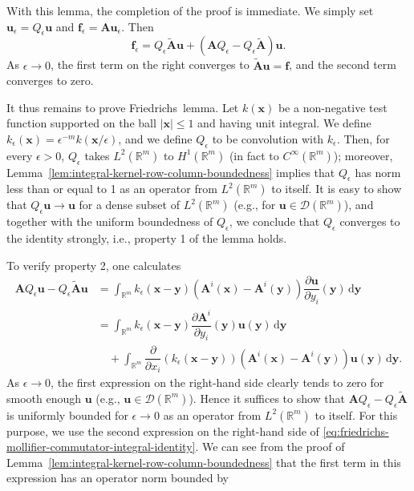 With this lemma, the completion of the proof is immediate. We simply set $\bm{u}_\epsilon=Q_\epsilon\bm{u}$ and $\bm{f}_\epsilon=\bm{A}\bm{u}_\epsilon$. Then
\begin{equation}\label{eq:symmetric-hyperbolic-friedrichs-graph-approximation}
\bm{f}_\epsilon=Q_\epsilon\widetilde{\bm{A}}\bm{u}+(\bm{A}Q_\epsilon-Q_\epsilon\widetilde{\bm{A}})\bm{u}.
\end{equation}
As $\epsilon\to0$, the first term on the right converges to $\widetilde{\bm{A}}\bm{u}=\bm{f}$, and the second term converges to zero.

\begin{Proof}
It thus remains to prove Friedrichs\textquotesingle\ lemma. Let $k(\bm{x})$ be a non-negative test function supported on the ball $|\bm{x}|\leq1$ and having unit integral. We define $k_\epsilon(\bm{x})=\epsilon^{-m}k(\bm{x}/\epsilon)$, and we define $Q_\epsilon$ to be convolution with $k_\epsilon$. Then, for every $\epsilon>0$, $Q_\epsilon$ takes $L^2(\mathbb{R}^m)$ to $H^1(\mathbb{R}^m)$ (in fact to $C^\infty(\mathbb{R}^m)$); moreover, Lemma~\ref{lem:integral-kernel-row-column-boundedness} implies that $Q_\epsilon$ has norm less than or equal to 1 as an operator from $L^2(\mathbb{R}^m)$ to itself. It is easy to show that $Q_\epsilon\bm{u}\to\bm{u}$ for a dense subset of $L^2(\mathbb{R}^m)$ (e.g., for $\bm{u}\in\mathcal{D}(\mathbb{R}^m)$), and together with the uniform boundedness of $Q_\epsilon$, we conclude that $Q_\epsilon$ converges to the identity strongly, i.e., property 1 of the lemma holds.\par To verify property 2, one calculates
\begin{equation}\label{eq:friedrichs-mollifier-commutator-integral-identity}
\begin{aligned}
\bm{A}Q_\epsilon\bm{u}-Q_\epsilon\widetilde{\bm{A}}\bm{u}&=\int_{\mathbb{R}^m}k_\epsilon(\bm{x}-\bm{y})(\bm{A}^i(\bm{x})-\bm{A}^i(\bm{y}))\dfrac{\partial\bm{u}}{\partial y_i}(\bm{y})\,\mathrm{d}\bm{y}\\
&=\int_{\mathbb{R}^m}k_\epsilon(\bm{x}-\bm{y})\dfrac{\partial\bm{A}^i}{\partial y_i}(\bm{y})\bm{u}(\bm{y})\,\mathrm{d}\bm{y}\\
&\quad+\int_{\mathbb{R}^m}\dfrac{\partial}{\partial x_i}(k_\epsilon(\bm{x}-\bm{y}))(\bm{A}^i(\bm{x})-\bm{A}^i(\bm{y}))\bm{u}(\bm{y})\,\mathrm{d}\bm{y}.
\end{aligned}
\end{equation}
As $\epsilon\to0$, the first expression on the right-hand side clearly tends to zero for smooth enough $\bm{u}$ (e.g., $\bm{u}\in\mathcal{D}(\mathbb{R}^m)$). Hence it suffices to show that $\bm{A}Q_\epsilon-Q_\epsilon\widetilde{\bm{A}}$ is uniformly bounded for $\epsilon\to0$ as an operator from $L^2(\mathbb{R}^m)$ to itself. For this purpose, we use the second expression on the right-hand side of \eqref{eq:friedrichs-mollifier-commutator-integral-identity}. We can see from the proof of Lemma~\ref{lem:integral-kernel-row-column-boundedness} that the first term in this expression has an operator norm bounded by

\end{Proof}
